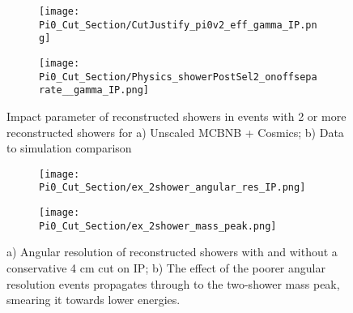 \documentclass{article}
\begin{document}
\begin{figure}[H]
\centering
  \begin{subfigure}[t]{0.35\textwidth}
    \centering
\texttt{[image: Pi0\_Cut\_Section/CutJustify\_pi0v2\_eff\_gamma\_IP.png]}
  \caption{ }
  \end{subfigure} 
  \hspace{20mm}
  \begin{subfigure}[t]{0.35\textwidth}
    \centering
\texttt{[image: Pi0\_Cut\_Section/Physics\_showerPostSel2\_onoffseparate\_\_gamma\_IP.png]}
  \caption{ }
  \end{subfigure} 
\caption{ Impact parameter of reconstructed showers in events with 2 or more reconstructed showers for a) Unscaled MCBNB + Cosmics; b) Data to simulation comparison }
\label{fig:cutjust_pi0_IP}
\end{figure}

\begin{figure}[H]
\centering
  \begin{subfigure}[t]{0.25\textwidth}
    \centering
\texttt{[image: Pi0\_Cut\_Section/ex\_2shower\_angular\_res\_IP.png]}
  \caption{ }
  \end{subfigure} 
  \hspace{40mm}
  \begin{subfigure}[t]{0.25\textwidth}
    \centering
\texttt{[image: Pi0\_Cut\_Section/ex\_2shower\_mass\_peak.png]}
  \caption{ }
  \end{subfigure} 
\caption{ a) Angular resolution of reconstructed showers with and without a conservative 4 cm cut on IP; b) The effect of the poorer angular resolution events propagates through to the two-shower mass peak, smearing it towards lower energies. }
\label{fig:ex_cutjust_IP}
\end{figure}
\end{document}
